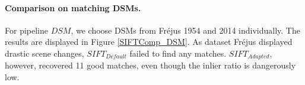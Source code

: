 \paragraph{Comparison on matching DSMs.}
For pipeline ${DSM}$, we choose DSMs from Fr{\'e}jus 1954 and 2014 individually. The results are displayed in Figure \ref{SIFTComp_DSM}. As dataset Fr{\'e}jus displayed drastic scene changes, $SIFT_{Default}$ failed to find any matches. $SIFT_{Adapted}$, however, recovered 11 good matches, even though the inlier ratio is dangerously low.\\
\begin{figure}[htbp]
	\begin{center}
\end{center}
\end{figure}

